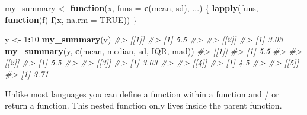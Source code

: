 \documentclass[]{book}
\newenvironment{Shaded}{\begin{snugshade}}{\end{snugshade}}
\newcommand{\KeywordTok}[1]{\textcolor[rgb]{0.13,0.29,0.53}{\textbf{#1}}}
\newcommand{\DataTypeTok}[1]{\textcolor[rgb]{0.13,0.29,0.53}{#1}}
\newcommand{\DecValTok}[1]{\textcolor[rgb]{0.00,0.00,0.81}{#1}}
\newcommand{\StringTok}[1]{\textcolor[rgb]{0.31,0.60,0.02}{#1}}
\newcommand{\CommentTok}[1]{\textcolor[rgb]{0.56,0.35,0.01}{\textit{#1}}}
\newcommand{\OtherTok}[1]{\textcolor[rgb]{0.56,0.35,0.01}{#1}}
\newcommand{\ControlFlowTok}[1]{\textcolor[rgb]{0.13,0.29,0.53}{\textbf{#1}}}
\newcommand{\OperatorTok}[1]{\textcolor[rgb]{0.81,0.36,0.00}{\textbf{#1}}}
\newcommand{\NormalTok}[1]{#1}
\begin{document}
\begin{Shaded}
\begin{Highlighting}[]
\NormalTok{my_summary <-}\StringTok{ }\ControlFlowTok{function}\NormalTok{(x, }\DataTypeTok{funs =} \KeywordTok{c}\NormalTok{(mean, sd), ...) \{}
  \KeywordTok{lapply}\NormalTok{(funs, }\ControlFlowTok{function}\NormalTok{(f) }\KeywordTok{f}\NormalTok{(x, }\DataTypeTok{na.rm =} \OtherTok{TRUE}\NormalTok{))}
\NormalTok{\}}

\NormalTok{y <-}\StringTok{ }\DecValTok{1}\OperatorTok{:}\DecValTok{10}
\KeywordTok{my_summary}\NormalTok{(y)}
\CommentTok{#> [[1]]}
\CommentTok{#> [1] 5.5}
\CommentTok{#> }
\CommentTok{#> [[2]]}
\CommentTok{#> [1] 3.03}
\KeywordTok{my_summary}\NormalTok{(y, }\KeywordTok{c}\NormalTok{(mean, median, sd, IQR, mad))}
\CommentTok{#> [[1]]}
\CommentTok{#> [1] 5.5}
\CommentTok{#> }
\CommentTok{#> [[2]]}
\CommentTok{#> [1] 5.5}
\CommentTok{#> }
\CommentTok{#> [[3]]}
\CommentTok{#> [1] 3.03}
\CommentTok{#> }
\CommentTok{#> [[4]]}
\CommentTok{#> [1] 4.5}
\CommentTok{#> }
\CommentTok{#> [[5]]}
\CommentTok{#> [1] 3.71}
\end{Highlighting}
\end{Shaded}

Unlike most languages you can define a function within a function and /
or return a function. This nested function only lives inside the parent
function.
\end{document}
